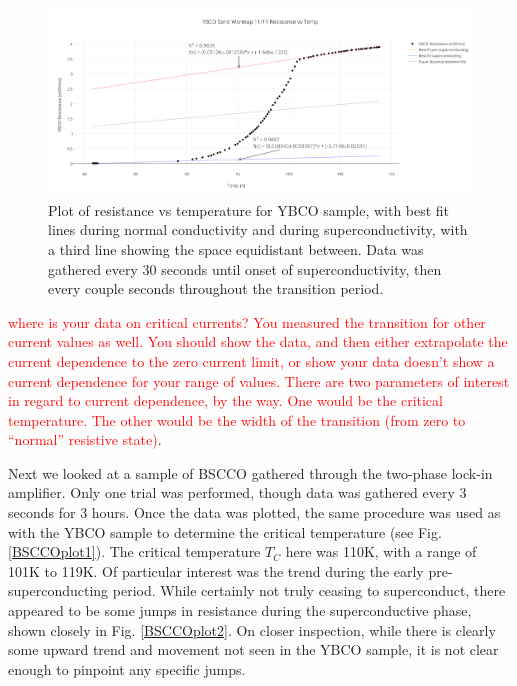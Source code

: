 \documentclass[prb,preprint]{revtex4-1}
\begin{document}
\begin{figure}[h!]
\centering
\includegraphics[width=7in]{ybco_sand_warmup_1111_resistance_vs_temp.png}
\caption{Plot of resistance vs temperature for YBCO sample, with best fit lines during normal conductivity and during superconductivity, with a third line showing the space equidistant between. Data was gathered every 30 seconds until onset of superconductivity, then every couple seconds throughout the transition period.}
\label{YBCOplot2}
\end{figure}

\textcolor{red}{where is your data on critical currents? You measured the transition for other current values as well. You should show the data, and then either extrapolate the current dependence to the zero current limit, or show your data doesn't show a current dependence for your range of values. There are two parameters of interest in regard to current dependence, by the way. One would be the critical temperature. The other would be the width of the transition (from zero to ``normal'' resistive state)}.  

Next we looked at a sample of BSCCO gathered through the two-phase lock-in amplifier. Only one trial was performed, though data was gathered every 3 seconds for 3 hours. Once the data was plotted, the same procedure was used as with the YBCO sample to determine the critical temperature (see Fig. \ref{BSCCOplot1}). The critical temperature $T_C$ here was 110K, with a range of 101K to 119K. Of particular interest was the trend during the early pre-superconducting period. While certainly not truly ceasing to superconduct, there appeared to be some jumps in resistance during the superconductive phase, shown closely in Fig. \ref{BSCCOplot2}. On closer inspection, while there is clearly some upward trend and movement not seen in the YBCO sample, it is not clear enough to pinpoint any specific jumps.
\end{document}

